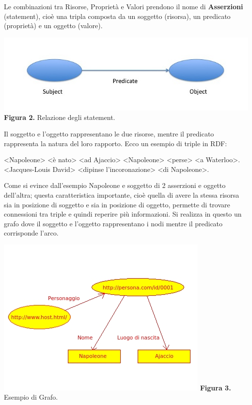 \documentclass[a4paper,11pt]{article}
\begin{document}
\begin{enumerate}
\begin{enumerate}[label*=\arabic*.]
Le combinazioni tra Risorse, Proprietà e Valori prendono il nome di \textbf{Asserzioni} (statement), cioè una tripla composta da un soggetto (risorsa), un predicato (proprietà) e un oggetto (valore). 
			\begin{center}
				\includegraphics[scale=0.5]{Assertion.jpg}\newline
				\textbf{Figura 2.} Relazione degli statement.
			\end{center}
			
Il soggetto e l'oggetto rappresentano le due risorse, mentre il predicato rappresenta la natura del loro rapporto.
Ecco un esempio di triple in RDF:

<Napoleone> <è nato> <ad Ajaccio>\newline
<Napoleone> <perse> <a Waterloo>.\newline
<Jacques-Louis David> <dipinse l'incoronazione> <di Napoleone>.

Come si evince dall'esempio Napoleone e soggetto di 2 asserzioni e oggetto dell'altra; questa caratteristica importante, cioè quella di avere la stessa risorsa sia in posizione di soggetto e sia in posizione di oggetto, permette di trovare connessioni tra triple e quindi reperire più informazioni.
Si realizza in questo un grafo dove il soggetto e l'oggetto rappresentano i nodi mentre il predicato corrisponde l'arco.

			\begin{center}
				\includegraphics[scale=1]{Napoleone.jpeg}\newline
				\textbf{Figura 3.} Esempio di Grafo.
			\end{center}


\end{enumerate}
\end{enumerate}
\end{document}

